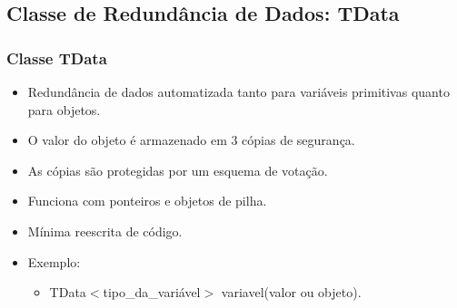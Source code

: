 \subsection{Classe de Redundância de Dados: TData}

\begin{frame}
	\frametitle{Classe TData}	
		\begin{itemize}
			\item Redundância de dados automatizada tanto para variáveis primitivas quanto para objetos.
			\item O valor do objeto é armazenado em 3 cópias de segurança.
			\item As cópias são protegidas por um esquema de votação.
			\item Funciona com ponteiros e objetos de pilha.
			\item Mínima reescrita de código.
			\item Exemplo:
			\begin{itemize}
			\item TData$<$tipo\_da\_variável$>$ variavel(valor ou objeto).
			\end{itemize}		
		\end{itemize}		
\end{frame}



